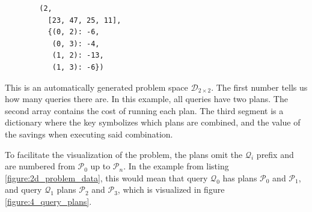 \begin{listing}[!ht]
    \centering
    \begin{verbatim}
        (2,
          [23, 47, 25, 11],
          {(0, 2): -6,
           (0, 3): -4,
           (1, 2): -13,
           (1, 3): -6})
    \end{verbatim}
    \caption{This is an automatically generated problem space $\mathcal{D}_{2\times2}$. The first number tells us how many queries there are. In this example, all queries have two plans. The second array contains the cost of running each plan. The third segment is a dictionary where the key symbolizes which plans are combined, and the value of the savings when executing said combination.}
    \label{figure:2d_problem_data}
\end{listing}

To facilitate the visualization of the problem, the plans omit the $\mathcal{Q}_i$ prefix and are numbered from $\mathcal{P}_0$ up to $\mathcal{P}_n$. In the example from listing \ref{figure:2d_problem_data}, this would mean that query $\mathcal{Q}_0$ has plans $\mathcal{P}_0$ and $\mathcal{P}_1$, and query $\mathcal{Q}_1$ plans $\mathcal{P}_2$ and $\mathcal{P}_3$, which is visualized in figure \ref{figure:4_query_plans}.

